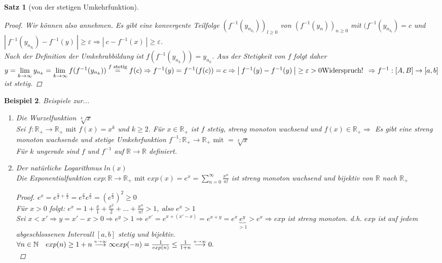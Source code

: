 \documentclass[a4paper,titlepage,oneside]{article}
\def\N{\ensuremath{\mathbb{N}} }
\def\R{\ensuremath{\mathbb{R}} }
\renewcommand{\epsilon}{\ensuremath{\varepsilon} }
\def\WSP{\text{Widerspruch! }}
\newcommand{\suminf}[2][n]{\ensuremath{\sum_{#1= 0}^{\infty}{#2}}}
\renewcommand{\liminf}[2][n]{\ensuremath{\lim\limits_{#1 \rightarrow \infty}{#2}}}
\newcommand{\abs}[1]{\ensuremath{\left|\:#1\:\right|}}
\newcommand{\longtoinf}[1][n]{\ensuremath{\overset{\scriptscriptstyle{#1 \to \infty}}{\longrightarrow}}}
\theoremstyle{thmstyle}
\newtheorem{satz}{Satz}[subsection]
\newtheorem{bsp}[satz]{Beispiel}
\begin{document}
\begin{satz}[von der stetigen Umkehrfunktion]
\begin{proof}
Wir können also annehmen. Es gibt eine konvergente Teilfolge $(f^{-1}(y_{n_{k_l}}))_{l \ge 0}$ von $(f^{-1}(y_n))_{n \ge 0}$ mit $(f^{-1}(y_{n_{k_l}}) = c$  und $\abs{f^{-1}(y_{n_{k_l}}) - f^{-1}(y)} \ge \epsilon \Rightarrow \abs{c - f^{-1}(x)} \ge \epsilon$. \\
 Nach der Definition der Umkehrabbildung ist $f(f^{-1}(y_{n_k})) = y_{n_k}$. Aus der Stetigkeit von $f$ folgt daher $y = \liminf[k]{y_{n_k}} = \liminf[k]{f(f^{-1}(y_{n_k}))}  \overset{f \text{ stetig}}{=} f(c)\\
 \Rightarrow f^{-1}(y) = f^{-1}(f(c)) = c
\Rightarrow \abs{f^{-1}(y) - f^{-1}(y)} \ge \epsilon > 0 \WSP \Rightarrow f^{-1}:[A,B] \to [a,b] $ ist stetig.
\end{proof}
\end{satz}

\begin{bsp}
Beispiele zur...
\begin{enumerate}
\item Die Wurzelfunktion $\sqrt[k]{x}$\\
Sei $f: \R_+ \to \R_+ \text{ mit } f(x) = x^k $ und $ k \ge 2$.
Für $x \in \R_+$ ist $f$ stetig, streng monoton wachsend und $f(x) \in \R_+ \Rightarrow $ Es gibt eine streng monoton wachsende und stetige Umkehrfunktion $f^{-1}: \R_+ \to \R_+ \text{ mit } = \sqrt[k]{x}$\\
Für $k$ ungerade sind $f$ und $f^{-1}$ auf $\R \to \R$ definiert.
\item Der natürliche Logarithmus $ln(x)$\\
Die Exponentialfunktion $exp: \R \to \R_+ \text{ mit } exp(x) = e^x = \suminf{\frac{x^n}{n!}}$ ist streng monoton wachsend und bijektiv von \R nach $\R_+$
\begin{proof}
	$e^x = e^{\frac{x}{2} + \frac{x}{2}} = e^{\frac{x}{2}} e^{\frac{x}{2}} = (e^{\frac{x}{2}})^2 \ge 0$\\
	Für $x > 0$ folgt: $e^x = 1 + \frac{x}{1} + \frac{x^2}{2} + \dots + \frac{x^n}{n!} > 1$, also $e^x > 1$\\
	Sei $x < x' \Rightarrow y = x' - x > 0 \Rightarrow e^y > 1 \Rightarrow e^{x'} = e^{x+(x'-x)} = e^{x+y} = e^x \underbrace{e^y}_{> 1} > e^x \Rightarrow exp$ ist streng monoton.
	d.h. $exp$ ist auf jedem abgeschlossenen Intervall $[a,b]$ stetig und bijektiv.\\
	$\forall n\in\N \quad 	exp(n)\ge 1 + n \longtoinf \infty \\
					exp(-n) = \frac{1}{exp(n)} \le \frac{1}{1+n} \longtoinf 0.$\\

\end{proof}
\end{enumerate}
\end{bsp}
\end{document}
